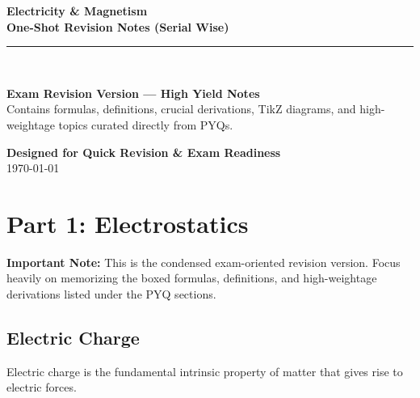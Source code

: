 \documentclass[11pt,a4paper]{article}
\begin{document}
\begin{titlepage}
    \centering
    \vspace*{2cm}
    {\Huge\bfseries\color{RoyalBlue} Electricity \& Magnetism}\\[0.6cm]
    {\Large\bfseries\color{Eggplant} One-Shot Revision Notes (Serial Wise)}\\[1.5cm]
    \rule{\linewidth}{1.5pt}\\[1.5cm]
    
    \begin{tcolorbox}[colback=RoyalBlue!5!white, colframe=RoyalBlue, arc=4mm, boxrule=1pt, halign=center, width=0.85\linewidth]
        \large\sffamily\color{DarkSlate}
        \textbf{Exam Revision Version --- High Yield Notes} \\[0.3cm]
        Contains formulas, definitions, crucial derivations, TikZ diagrams, and high-weightage topics curated directly from PYQs.
    \end{tcolorbox}
    
    \vfill
    {\large \textbf{Designed for Quick Revision \& Exam Readiness}}\\[0.2cm]
    {\large \today}
    \vspace*{1cm}
\end{titlepage}

\tableofcontents
\newpage

\section{Part 1: Electrostatics}

\begin{tcolorbox}[colback=yellow!10!white, colframe=orange, arc=2mm, boxrule=1pt]
    \sffamily\small\textbf{Important Note:} This is the condensed exam-oriented revision version. Focus heavily on memorizing the boxed formulas, definitions, and high-weightage derivations listed under the PYQ sections.
\end{tcolorbox}

\subsection{Electric Charge}
Electric charge is the fundamental intrinsic property of matter that gives rise to electric forces.
\end{document}

